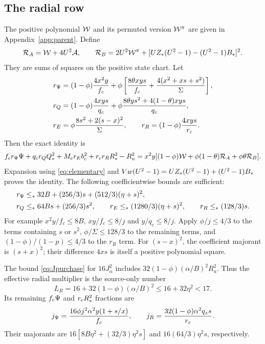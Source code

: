 \subsection*{The radial row}
The positive polynomial $\mathcal W$ and its permuted version $\mathcal W^\pi$ are given
in Appendix~\ref{app:parent}. Define
\[
 \mathcal R_A=\mathcal W+4U^2\mathcal A,\qquad
 \mathcal R_B=2U^2\mathcal W^\pi+
       [UZ_*(U^2-1)-(U^2-1)B_*]^2 .
\]
They are sums of squares on the positive state chart.
Let
\begin{align}
 r_\Psi&=(1-\phi)\frac{4x^2y}{f_c}
       +\phi\left[\frac{8\theta xys}{f_c}
                     +\frac{4(x^2+xs+s^2)}{\Sigma}\right],\notag\\
 r_Q&=(1-\phi)\frac{4xys}{q_c}
        +\phi\frac{8\theta ys^2+4(1-\theta)xys}{q_c},\notag\\
 r_E&=\phi\frac{8s^2+2(s-x)^2}{\Sigma},\qquad
 r_R=(1-\phi)\frac{4xys}{r_c}.
 \label{eq:radialfractions}
\end{align}
Then the exact identity is
\begin{align}
 f_cr_\Psi\Psi+q_cr_QQ_*^2+M_er_Eb_{\mathrm c}^2+r_cr_RR_*^2-R_u^2
 =x^2y[(1-\phi)\mathcal W+\phi(1-\theta)\mathcal R_A
                                      +\phi\theta\mathcal R_B].
 \label{eq:radialpurchase}
\end{align}
Expansion using \eqref{eq:elementary} and
$Vw(U^2-1)=UZ_*(U^2-1)+(U^2-1)B_*$ proves the identity.
The following coefficientwise bounds are sufficient:
\begin{equation}
 \begin{split}
 r_\Psi&\leq_*32B+(256/3)s+(512/3)(\eta+s)^2,\\
 r_Q&\leq_*64Bs+(256/3)s^2,\qquad
 r_E\leq_*(1280/3)(\eta+s)^2,\qquad
 r_R\leq_*(128/3)s .
 \end{split}\label{eq:radialmajorants}
\end{equation}
For example $x^2y/f_c\leq8B$, $xy/f_c\leq8/j$ and $y/q_c\leq8/j$.
Apply $\phi/j\leq4/3$ to the terms containing $s$ or $s^2$,
$\phi/\Sigma\leq128/3$ to the remaining terms, and
$(1-\phi)/(1-p)\leq4/3$ to the $r_R$ term.
For $(s-x)^2$, the coefficient majorant is $(s+x)^2$; their difference
$4xs$ is itself a positive polynomial square.

The bound \eqref{eq:Jpurchase} for $16J_\alpha^2$ includes
$32(1-\phi)(\alpha/B)^2R_u^2$.
Thus the effective radial multiplier is the source-only number
\begin{equation}
 L_R=16+32(1-\phi)(\alpha/B)^2
          \leq16+32\eta^2<17 .
 \label{eq:radialmultiplier}
\end{equation}
Its remaining $f_c\Psi$ and $r_cR_*^2$ fractions are
\begin{equation}
 j_\Psi=\frac{16\phi j^2\alpha^2y(1+s/x)}{f_c},\qquad
 j_R=\frac{32(1-\phi)\alpha^2q_zs}{r_c}.
 \label{eq:Jfractions}
\end{equation}
Their majorants are $16[8B\eta^2+(32/3)\eta^2s]$ and
$16(64/3)\eta^2s$, respectively.

